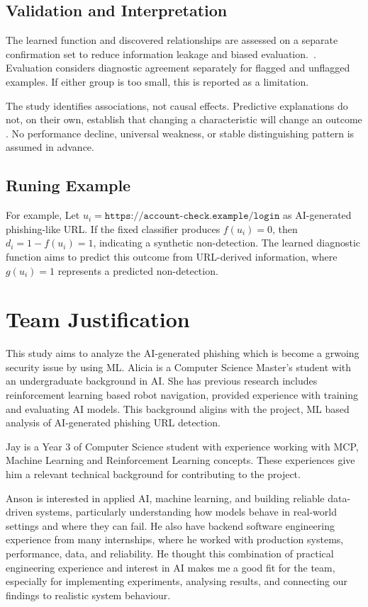 \documentclass[sigconf]{acmart}
\begin{document}
\begin{bibunit}
\subsection{Validation and Interpretation}

The learned function and discovered relationships are assessed on a separate confirmation set to reduce information leakage and biased evaluation.~\cite{arp2022dos}. Evaluation considers diagnostic agreement separately for flagged and unflagged examples. If either group is too small, this is reported as a limitation.

The study identifies associations, not causal effects. Predictive explanations do not, on their own, establish that changing a characteristic will change an outcome \cite{dillon_shap_causal}. No performance decline, universal weakness, or stable distinguishing pattern is assumed in advance.


\subsection{Runing Example}
For example, Let
$u_i=\texttt{https://account-check.example/login}$ as AI-generated phishing-like URL. If the fixed classifier produces $f(u_i)=0$, then
$d_i=1-f(u_i)=1$, indicating a synthetic non-detection.
The learned diagnostic function aims to predict this outcome from
URL-derived information, where $g(u_i)=1$ represents a predicted
non-detection.

\section{Team Justification}

This study aims to analyze the AI-generated phishing which is become a grwoing security issue by using ML. Alicia is a Computer Science Master's student with an undergraduate background in AI. She has previous research includes reinforcement learning based robot navigation, provided experience with training and evaluating AI models. This background aligins with the project, ML based analysis of AI-generated phishing URL detection.

Jay is a Year 3 of Computer Science student with experience working with MCP, Machine Learning and Reinforcement Learning concepts. These experiences give him a relevant technical background for contributing to the project.

Anson is interested in applied AI, machine learning, and building reliable data-driven systems, particularly understanding how models behave in real-world settings and where they can fail. He also have backend software engineering experience from many internships, where he worked with production systems, performance, data, and reliability. He thought this combination of practical engineering experience and interest in AI makes me a good fit for the team, especially for implementing experiments, analysing results, and connecting our findings to realistic system behaviour.


\end{bibunit}
\end{document}
